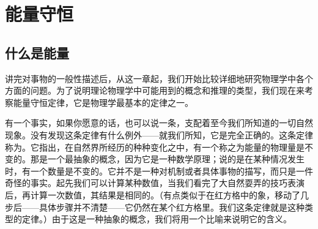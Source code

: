 \chapter{能量守恒}

\section{什么是能量}

讲完对事物的一般性描述后，从这一章起，我们开始比较详细地研究物理学中各个方面的问题。为了说明理论物理学中可能用到的概念和推理的类型，我们现在来考察能量守恒定律，它是物理学最基本的定律之一。

有一个事实，如果你愿意的话，也可以说一条，支配着至今我们所知道的一切自然现象。没有发现这条定律有什么例外——就我们所知，它是完全正确的。这条定律称为。它指出，在自然界所经历的种种变化之中，有一个称之为能量的物理量是不变的。那是一个最抽象的概念，因为它是一种数学原理；说的是在某种情况发生时，有一个数量是不变的。它并不是一种对机制或者具体事物的描写，而只是一件奇怪的事实。起先我们可以计算某种数值，当我们看完了大自然耍弄的技巧表演后，再计算一次数值，其结果是相同的。（有点类似于在红方格中的象，移动了几步后——具体步骤并不清楚——它仍然在某个红方格里。我们这条定律就是这种类型的定律。）由于这是一种抽象的概念，我们将用一个比喻来说明它的含义。


